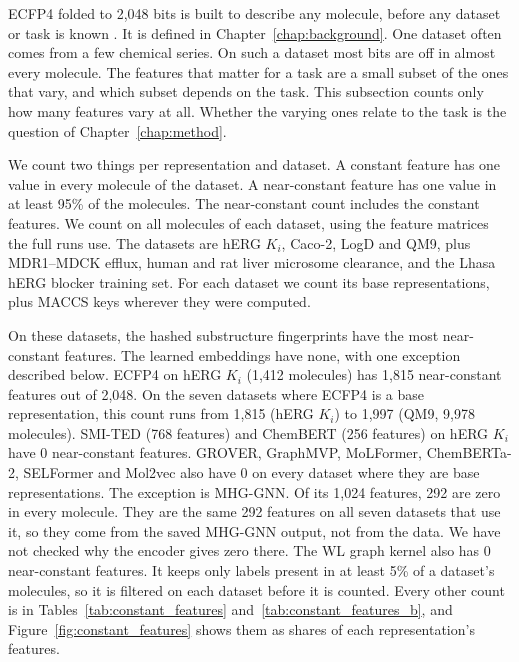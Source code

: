 ECFP4 folded to 2,048 bits is built to describe any molecule, before any dataset or task is known \citep{rogers2010}. It is defined in Chapter~\ref{chap:background}. One dataset often comes from a few chemical series. On such a dataset most bits are off in almost every molecule. The features that matter for a task are a small subset of the ones that vary, and which subset depends on the task. This subsection counts only how many features vary at all. Whether the varying ones relate to the task is the question of Chapter~\ref{chap:method}.

We count two things per representation and dataset. A constant feature has one value in every molecule of the dataset. A near-constant feature has one value in at least 95\% of the molecules. The near-constant count includes the constant features. We count on all molecules of each dataset, using the feature matrices the full runs use. The datasets are hERG $K_i$, Caco-2, LogD and QM9, plus MDR1--MDCK efflux, human and rat liver microsome clearance, and the Lhasa hERG blocker training set. For each dataset we count its base representations, plus MACCS keys wherever they were computed.

On these datasets, the hashed substructure fingerprints have the most near-constant features. The learned embeddings have none, with one exception described below. ECFP4 on hERG $K_i$ (1,412 molecules) has 1,815 near-constant features out of 2,048. On the seven datasets where ECFP4 is a base representation, this count runs from 1,815 (hERG $K_i$) to 1,997 (QM9, 9,978 molecules). SMI-TED (768 features) and ChemBERT (256 features) on hERG $K_i$ have 0 near-constant features. GROVER, GraphMVP, MoLFormer, ChemBERTa-2, SELFormer and Mol2vec also have 0 on every dataset where they are base representations. The exception is MHG-GNN. Of its 1,024 features, 292 are zero in every molecule. They are the same 292 features on all seven datasets that use it, so they come from the saved MHG-GNN output, not from the data. We have not checked why the encoder gives zero there. The WL graph kernel also has 0 near-constant features. It keeps only labels present in at least 5\% of a dataset's molecules, so it is filtered on each dataset before it is counted. Every other count is in Tables~\ref{tab:constant_features} and~\ref{tab:constant_features_b}, and Figure~\ref{fig:constant_features} shows them as shares of each representation's features.

